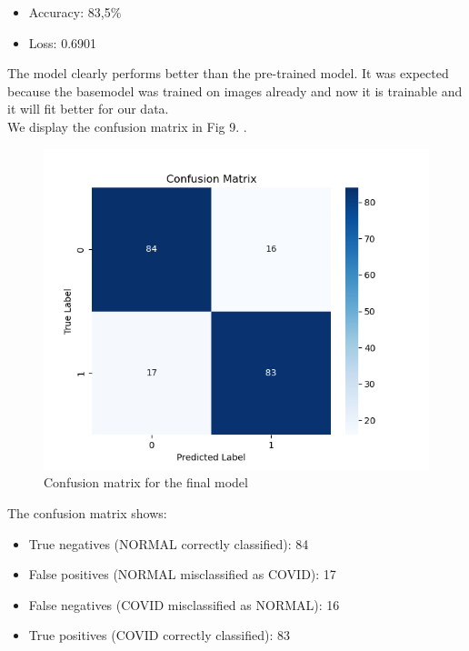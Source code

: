 \documentclass[conference]{IEEEtran}
\begin{document}
\begin{itemize}
	\item Accuracy: 83,5\%
	\item Loss: 0.6901
\end{itemize}

The model clearly performs better than the pre-trained model. It was expected because the basemodel was trained on images already and now it is trainable and it will fit better for our data.\\

We display the confusion matrix in Fig 9. .

\begin{figure}[htbp]
	\centerline{\includegraphics[width=\linewidth]{Images/Transferlearning_3.png}}
	\caption{Confusion matrix for the final model}
	\label{fig:transferlearning_3}
\end{figure}

The confusion matrix shows:\\

\begin{itemize}
	\item True negatives (NORMAL correctly classified): 84
	\item False positives (NORMAL misclassified as COVID): 17
	\item False negatives (COVID misclassified as NORMAL): 16
	\item True positives (COVID correctly classified): 83
\end{itemize}
\end{document}
